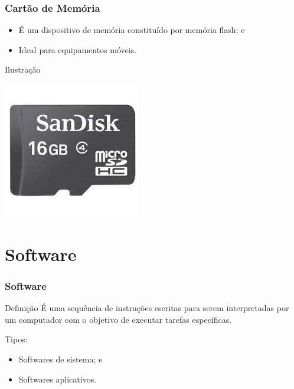 \documentclass[aspectratio=169]{beamer} %
\begin{document}
\begin{frame}
	\frametitle{Cartão de Memória}
		
	\begin{itemize}
		\item É um dispositivo de memória constituído por memória flash; e 
		\item Ideal para equipamentos móveis.
	\end{itemize}\vfill
	
	\begin{exampleblock}{Ilustra\c cão}
		\begin{center}
			\includegraphics[scale=0.4]{img/cartao_de_memoria}
		\end{center}
	\end{exampleblock}
\end{frame}

\section{Software}

\begin{frame}
	\frametitle{Software}
		
	\begin{block}{Defini\c cão}
		É uma sequência de instruções escritas para serem interpretadas por um computador com o objetivo de executar tarefas específicas.
	\end{block}\vfill
	
	Tipos:
	\begin{itemize}
		\item Softwares de sistema; e
		\item Softwares aplicativos.
	\end{itemize}
\end{frame}
\end{document}
